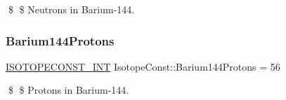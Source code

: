 \$ \$ Neutrons in Barium-\/144. \mbox{\label{group___isotope_const-_barium-_ba144_gaa8c8e814f22af569d0ec8a369822093f}} 
\subsubsection{\texorpdfstring{Barium144\+Protons}{Barium144Protons}}
{\footnotesize\ttfamily \mbox{\hyperlink{group___isotope_const-_macros_ga5f18360b3e99483a35c32d789e62621c}{I\+S\+O\+T\+O\+P\+E\+C\+O\+N\+S\+T\+\_\+\+I\+NT}} Isotope\+Const\+::\+Barium144\+Protons = 56}

\$ \$ Protons in Barium-\/144. 